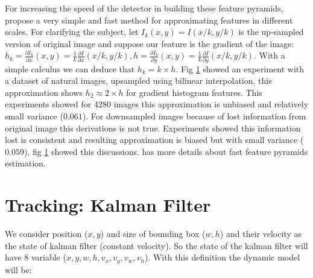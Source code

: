 \documentclass[conference]{IEEEtran}
\begin{document}
For increasing the speed of the detector in building these feature pyramids, \cite{dollar2014fast} propose a very simple and fast method for approximating features in different scales. For clarifying the subject, let $I_{k}(x,y)=I(x/k,y/k)$ is the up-sampled version of original image and suppose our feature is the gradient of the image: $ h_k = \frac{\partial I_k}{\partial x}(x,y)=\frac{1}{k}\frac{\partial I}{\partial x}(x/k,y/k), h = \frac{\partial I_k}{\partial y}(x,y)=\frac{1}{k}\frac{\partial I}{\partial y}(x/k,y/k)$. With a simple calculus we can deduce that $h_k=k\times h$.
Fig \ref{} showed an experiment with a dataset of natural images, upsampled using bilinear interpolation, this approximation shows $h_{2}\approx2\times h$ for gradient histogram features. This experiments showed for 4280 images this approximation is unbiased and relatively small variance ($0.061$). For downsampled images because of lost information from original image this derivations is not true. Experiments showed this information lost is consistent and resulting approximation is biased but with small variance ($0.059$), fig \ref{} showed this discussions. \cite{dollar2014fast} has more details about fast feature pyramids estimation.

\section{Tracking: Kalman Filter}

We consider position ($x,y$) and size of bounding box ($w,h$) and their velocity as the state of kalman filter (constant velocity). So the state of the kalman filter will have 8 variable ($x,y,w,h,v_x,v_y,v_w,v_h$).
With this definition the dynamic model will be:
\end{document}
